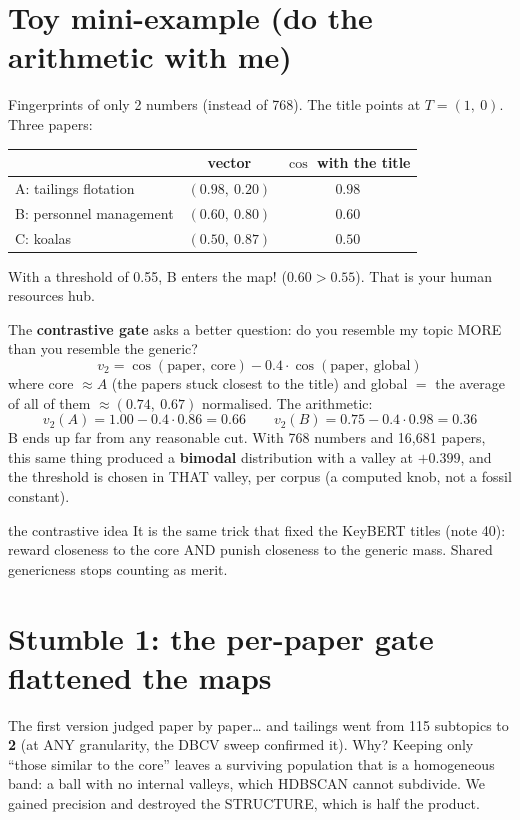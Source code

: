 \documentclass[11pt,a4paper]{article}
\begin{document}
\section{Toy mini-example (do the arithmetic with me)}

Fingerprints of only 2 numbers (instead of 768). The title points at $T=(1,\ 0)$. Three papers:

\begin{center}
\begin{tabular}{lcc}
 & vector & $\cos$ with the title \\
\hline
A: tailings flotation   & $(0.98,\ 0.20)$ & $0.98$ \\
B: personnel management & $(0.60,\ 0.80)$ & $0.60$ \\
C: koalas               & $(0.50,\ 0.87)$ & $0.50$ \\
\end{tabular}
\end{center}

With a threshold of 0.55, B enters the map! ($0.60 > 0.55$). That is your human resources hub.

The \textbf{contrastive gate} asks a better question: do you resemble my topic MORE than you
resemble the generic?
\[
v_2 = \cos(\mbox{paper},\ \mbox{core}) - 0.4 \cdot \cos(\mbox{paper},\ \mbox{global})
\]
where core $\approx A$ (the papers stuck closest to the title) and global $=$ the average of
all of them $\approx (0.74,\ 0.67)$ normalised. The arithmetic:
\[
v_2(A) = 1.00 - 0.4 \cdot 0.86 = \mathbf{0.66}
\qquad
v_2(B) = 0.75 - 0.4 \cdot 0.98 = \mathbf{0.36}
\]
B ends up far from any reasonable cut. With 768 numbers and 16,681 papers, this same thing
produced a \textbf{bimodal} distribution with a valley at $+0.399$, and the threshold is chosen
in THAT valley, per corpus (a computed knob, not a fossil constant).

\begin{concepto}{the contrastive idea}
It is the same trick that fixed the KeyBERT titles (note 40): reward closeness to the core AND
punish closeness to the generic mass. Shared genericness stops counting as merit.
\end{concepto}

\section{Stumble 1: the per-paper gate flattened the maps}

The first version judged paper by paper\ldots{} and tailings went from 115 subtopics to
\textbf{2} (at ANY granularity, the DBCV sweep confirmed it). Why? Keeping only ``those similar
to the core'' leaves a surviving population that is a homogeneous band: a ball with no internal
valleys, which HDBSCAN cannot subdivide. We gained precision and destroyed the STRUCTURE, which
is half the product.
\end{document}
